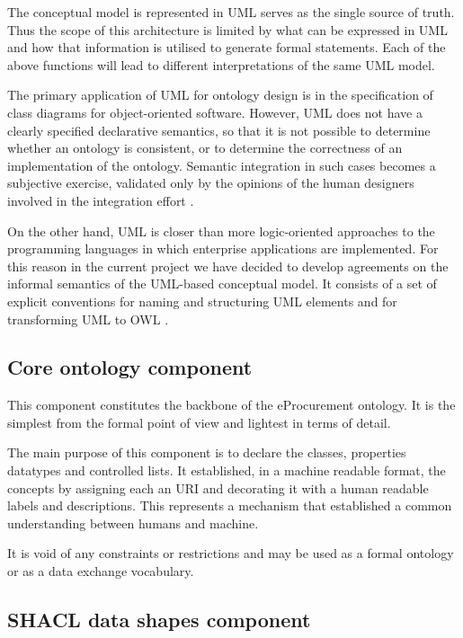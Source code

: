 	The conceptual model is represented in UML \citep{uml-userguide} serves as the single source of truth. Thus the scope of this architecture is limited by what can be expressed in UML and how that information is utilised to generate formal statements. Each of the above functions will lead to different interpretations of the same UML model.
	
	The primary application of UML \citep{fowler2004} for ontology design is in the specification of class diagrams for object-oriented software. However, UML does not have a clearly specified declarative semantics, so that it is not possible to determine whether an ontology is consistent, or to determine the correctness of an implementation of the ontology. Semantic integration in such cases becomes a subjective exercise, validated only by the opinions of the human designers involved in the integration effort \cite{grunninger2003}. 
	
	On the other hand, UML is closer than more logic-oriented approaches to the programming languages in which enterprise applications are implemented. For this reason in the current project we have decided to develop agreements on the informal semantics of the UML-based conceptual model. It consists of a set of explicit conventions for naming and structuring UML elements \cite{costetchi2020b} and for transforming UML to OWL \cite{costetchi2020c}.

	\subsection{Core ontology component}
	\label{sec:core-ontology}
	
	This component constitutes the backbone of the eProcurement ontology. It is the simplest from the formal point of view and lightest in terms of detail. 
	
	The main purpose of this component is to declare the classes, properties datatypes and controlled lists. It established, in a machine readable format, the concepts by assigning each an URI and decorating it with a human readable labels and descriptions. This represents a mechanism that established a common understanding between humans and machine. 
	
	It is void of any constraints or restrictions and may be used as a formal ontology or as a data exchange vocabulary.
	
	\subsection{SHACL data shapes component}
	\label{sec:shapes}
	
